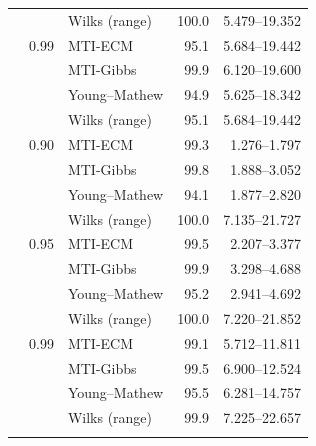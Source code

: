 \begin{longtable}{@{}rrlrr@{}}
 &  & Wilks (range) & 100.0 & 5.479--19.352 \\
\addlinespace[0.3em]
500 & 0.99 & MTI-ECM & 95.1 & 5.684--19.442 \\
 &  & MTI-Gibbs & 99.9 & 6.120--19.600 \\
 &  & Young--Mathew & 94.9 & 5.625--18.342 \\
 &  & Wilks (range) & 95.1 & 5.684--19.442 \\
\addlinespace[0.3em]
1000 & 0.90 & MTI-ECM & 99.3 & 1.276--1.797 \\
 &  & MTI-Gibbs & 99.8 & 1.888--3.052 \\
 &  & Young--Mathew & 94.1 & 1.877--2.820 \\
 &  & Wilks (range) & 100.0 & 7.135--21.727 \\
\addlinespace[0.3em]
1000 & 0.95 & MTI-ECM & 99.5 & 2.207--3.377 \\
 &  & MTI-Gibbs & 99.9 & 3.298--4.688 \\
 &  & Young--Mathew & 95.2 & 2.941--4.692 \\
 &  & Wilks (range) & 100.0 & 7.220--21.852 \\
\addlinespace[0.3em]
1000 & 0.99 & MTI-ECM & 99.1 & 5.712--11.811 \\
 &  & MTI-Gibbs & 99.5 & 6.900--12.524 \\
 &  & Young--Mathew & 95.5 & 6.281--14.757 \\
 &  & Wilks (range) & 99.9 & 7.225--22.657 \\
\addlinespace[0.3em]
\end{longtable}
\clearpage
